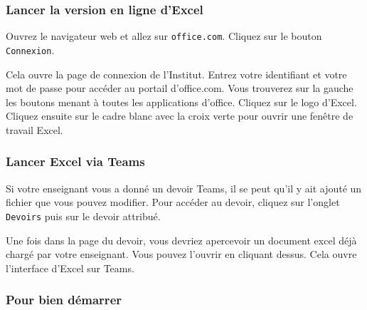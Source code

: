 
\subsubsection{Lancer la version en ligne d'Excel}

Ouvrez le navigateur web et allez sur \texttt{office.com}. Cliquez sur le bouton \texttt{Connexion}.


Cela ouvre la page de connexion de l'Institut. Entrez votre identifiant et votre mot de passe pour accéder au portail d'office.com. Vous trouverez sur la gauche les boutons menant à toutes les applications d'office. Cliquez sur le logo d'Excel. Cliquez ensuite sur le cadre blanc avec la croix verte pour ouvrir une fenêtre de travail Excel.


\subsubsection{Lancer Excel via Teams}

Si votre enseignant vous a donné un devoir Teams, il se peut qu'il y ait ajouté un fichier que vous pouvez modifier. Pour accéder au devoir, cliquez sur l'onglet \texttt{Devoirs}  puis sur le devoir attribué. 


Une fois dans la page du devoir, vous devriez apercevoir un document excel déjà chargé par votre enseignant. Vous pouvez l'ouvrir en cliquant dessus. Cela ouvre l'interface d'Excel sur Teams.



%
%
%
%


\subsubsection{Pour bien démarrer}


